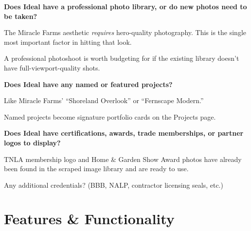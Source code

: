 \documentclass[11pt, letterpaper]{article}
\begin{document}
\begin{checklist}
  \item \textbf{Does Ideal have a professional photo library, or do new photos
        need to be taken?}
    \begin{checklist}
      \item The Miracle Farms aesthetic \emph{requires} hero-quality photography.
            This is the single most important factor in hitting that look.
      \item A professional photoshoot is worth budgeting for if the existing
            library doesn't have full-viewport-quality shots.
    \end{checklist}

  \item \textbf{Does Ideal have any named or featured projects?}
    \begin{checklist}
      \item Like Miracle Farms' ``Shoreland Overlook'' or ``Fernscape Modern.''
      \item Named projects become signature portfolio cards on the Projects page.
    \end{checklist}

  \item \textbf{Does Ideal have certifications, awards, trade memberships, or
        partner logos to display?}
    \begin{checklist}
      \item TNLA membership logo and Home \& Garden Show Award photos have already
            been found in the scraped image library and are ready to use.
      \item Any additional credentials? (BBB, NALP, contractor licensing seals, etc.)
    \end{checklist}
\end{checklist}

\section{Features \& Functionality}
\end{document}
